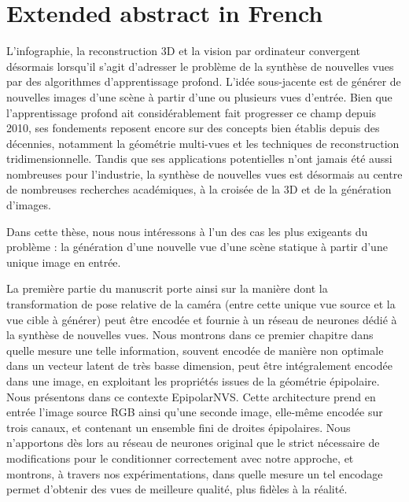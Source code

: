 \chapter{Extended abstract in French}
L'infographie, la reconstruction 3D et la vision par ordinateur convergent désormais lorsqu'il s'agit d'adresser le problème de la synthèse de nouvelles vues par des algorithmes d'apprentissage profond. L'idée sous-jacente est de générer de nouvelles images d'une scène à partir d'une ou plusieurs vues d'entrée. Bien que l'apprentissage profond ait considérablement fait progresser ce champ depuis 2010, ses fondements reposent encore sur des concepts bien établis depuis des décennies, notamment la géométrie multi-vues et les techniques de reconstruction tridimensionnelle. Tandis que ses applications potentielles n'ont jamais été aussi nombreuses pour l'industrie, la synthèse de nouvelles vues est désormais au centre de nombreuses recherches académiques, à la croisée de la 3D et de la génération d'images.

Dans cette thèse, nous nous intéressons à l'un des cas les plus exigeants du problème : la génération d'une nouvelle vue d'une scène statique à partir d'une unique image en entrée.

La première partie du manuscrit porte ainsi sur la manière dont la transformation de pose relative de la caméra (entre cette unique vue source et la vue cible à générer) peut être encodée et fournie à un réseau de neurones dédié à la synthèse de nouvelles vues. Nous montrons dans ce premier chapitre dans quelle mesure une telle information, souvent encodée de manière non optimale dans un vecteur latent de très basse dimension, peut être intégralement encodée dans une image, en exploitant les propriétés issues de la géométrie épipolaire. Nous présentons dans ce contexte EpipolarNVS. Cette architecture prend en entrée l'image source RGB ainsi qu'une seconde image, elle-même encodée sur trois canaux, et contenant un ensemble fini de droites épipolaires. Nous n'apportons dès lors au réseau de neurones original que le strict nécessaire de modifications pour le conditionner correctement avec notre approche, et montrons, à travers nos expérimentations, dans quelle mesure un tel encodage permet d'obtenir des vues de meilleure qualité, plus fidèles à la réalité.

